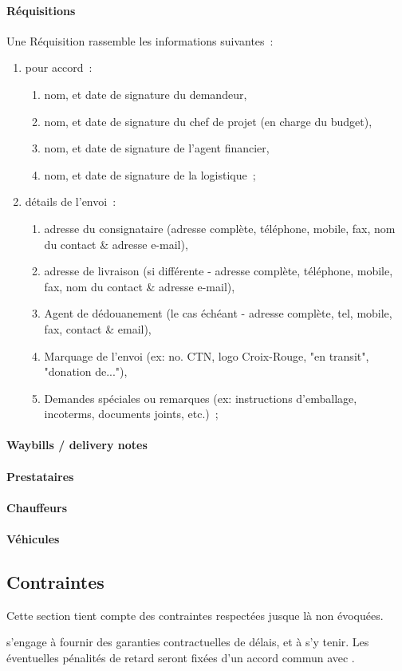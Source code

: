 \paragraph{Réquisitions}
Une Réquisition rassemble les informations suivantes~:
\begin{enumerate}
	\item pour accord~:
	\begin{enumerate}
		\item nom, et date de signature du demandeur,
		\item nom, et date de signature du  chef de projet (en charge du budget),
		\item nom, et date de signature de l'agent financier,
		\item nom, et date de signature de la logistique~;
	\end{enumerate}
	\item détails de l'envoi~:
	\begin{enumerate}
		\item adresse du consignataire (adresse complète, téléphone, mobile, fax, nom du contact & adresse e-mail),
		\item adresse de livraison (si différente - adresse complète, téléphone, mobile, fax, nom du contact & adresse e-mail),
		\item Agent de dédouanement (le cas échéant - adresse complète, tel, mobile, fax, contact & email),
		\item Marquage de l'envoi (ex: no. CTN, logo Croix-Rouge, "en transit", "donation de..."),
		\item Demandes spéciales ou remarques (ex: instructions d'emballage, incoterms, documents joints, etc.)~;
	\end{enumerate}
\end{enumerate}

\paragraph{Waybills / delivery notes}
\paragraph{Prestataires}
\paragraph{Chauffeurs}
\paragraph{Véhicules}

\subsection{Contraintes}
Cette section tient compte des contraintes respectées jusque là non évoquées.

\begin{constraint}
\amo s'engage à fournir des garanties contractuelles de délais, et à s'y tenir. Les éventuelles pénalités de retard seront fixées d'un accord commun avec \mo.
\end{constraint}
